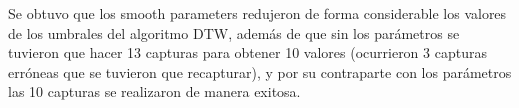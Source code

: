 Se obtuvo que los smooth parameters redujeron de forma considerable los valores de los umbrales del algoritmo DTW, además de que sin los parámetros se tuvieron que hacer 13 capturas para obtener 10 valores (ocurrieron 3 capturas erróneas que se tuvieron que recapturar), y por su contraparte con los parámetros las 10 capturas se realizaron de manera exitosa.\\


